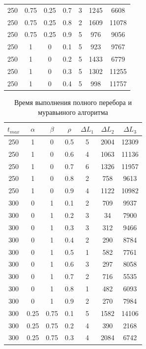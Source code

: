 \documentclass[12pt]{report}
\begin{document}
\begin{table}[H]
\begin{center}
\begin{tabular}{|c|c|c|c|c|c|c|}
				250 & 0.75 & 0.25 & 0.7 & 3 & 1245 & 6608 \\
				250 & 0.75 & 0.25 & 0.8 & 2 & 1609 & 11078 \\
				250 & 0.75 & 0.25 & 0.9 & 5 & 976 & 9056 \\
				250 & 1 & 0 & 0.1 & 5 & 923 & 9767 \\
				250 & 1 & 0 & 0.2 & 5 & 1433 & 6779 \\
				250 & 1 & 0 & 0.3 & 5 & 1302 & 11255 \\
				250 & 1 & 0 & 0.4 & 5 & 998 & 11757 \\
				\hline
			\end{tabular}
		\end{center}
	\end{table}
	\begin{table}[H]
		\begin{center}
			\caption[]{\label{tbl:only8} Время выполнения полного перебора и муравьиного алгоритма}
			\begin{tabular}{|c|c|c|c|c|c|c|}
				\hline
				$t_{max}$ & $\alpha$ & $\beta$ & $\rho$ & $\Delta L_{1}$ & $\Delta L_{2}$ & $\Delta L_{3}$\\
				\hline
				250 & 1 & 0 & 0.5 & 5 & 2004 & 12309 \\
				250 & 1 & 0 & 0.6 & 4 & 1063 & 11136 \\
				250 & 1 & 0 & 0.7 & 6 & 1326 & 11957 \\
				250 & 1 & 0 & 0.8 & 2 & 758 & 9613 \\
				250 & 1 & 0 & 0.9 & 4 & 1122 & 10982 \\
				300 & 0 & 1 & 0.1 & 2 & 709 & 9937 \\
				300 & 0 & 1 & 0.2 & 3 & 34 & 7900 \\
				300 & 0 & 1 & 0.3 & 3 & 312 & 9466 \\
				300 & 0 & 1 & 0.4 & 2 & 290 & 8784 \\
				300 & 0 & 1 & 0.5 & 1 & 582 & 7761 \\
				300 & 0 & 1 & 0.6 & 3 & 297 & 8058 \\
				300 & 0 & 1 & 0.7 & 2 & 716 & 5535 \\
				300 & 0 & 1 & 0.8 & 1 & 482 & 6093 \\
				300 & 0 & 1 & 0.9 & 2 & 270 & 7984 \\
				300 & 0.25 & 0.75 & 0.1 & 5 & 1582 & 14106 \\
				300 & 0.25 & 0.75 & 0.2 & 4 & 390 & 2168 \\
				300 & 0.25 & 0.75 & 0.3 & 4 & 2084 & 6742 \\

\end{tabular}
\end{center}
\end{table}
\end{document}
